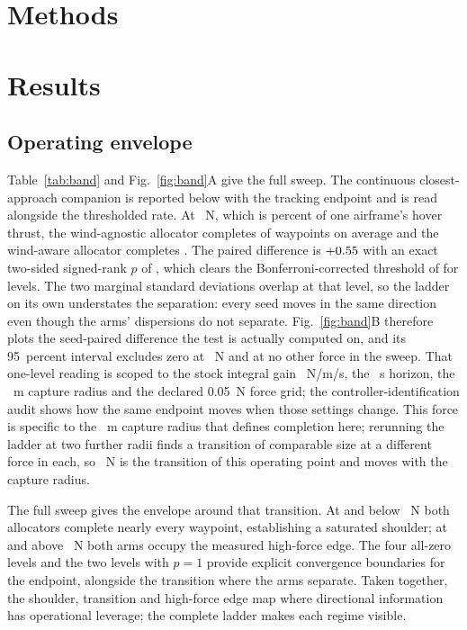 \section{Methods}



\section{Results}

\subsection{Operating envelope}

Table~\ref{tab:band} and Fig.~\ref{fig:band}A give the full sweep. The continuous
closest-approach companion is reported below with the tracking endpoint and is
read alongside the thresholded rate.
At \KneeLevel{}~N, which is \KneePctHover{} percent of one airframe's hover thrust, the
wind-agnostic allocator completes \KneeAgnostic{} of waypoints on average and the
wind-aware allocator completes \KneeAware{}. The paired difference is
$+0.55{}$ with an exact two-sided signed-rank $p$ of \KneeP{}, which clears
the Bonferroni-corrected threshold of \BonferroniAlpha{} for \NWindLevels{} levels.
The two marginal standard deviations overlap at that level, so the ladder on its
own understates the separation: every seed moves in the same direction even though
the arms' dispersions do not separate. Fig.~\ref{fig:band}B therefore plots the
seed-paired difference the test is actually computed on, and its 95~percent
interval excludes zero at \KneeLevel{}~N and at no other force in the sweep.
That one-level reading is scoped to the stock integral gain \StockKi{}~N/m/s,
the \EpisodeHorizonS{}~s horizon, the \CaptureRadius{}~m capture radius and the
declared 0.05~N force grid; the controller-identification audit shows how the
same endpoint moves when those settings change.
This force is specific to the \CaptureRadius{}~m capture radius that defines
completion here; rerunning the ladder at two further radii finds a transition
of comparable size at a different force in each, so \KneeLevel{}~N is the
transition of this operating point and moves with the capture radius.

The full sweep gives the envelope around that transition. At and below
\SaturationLevel{}~N both allocators complete nearly every waypoint, establishing a
saturated shoulder; at and above \CollapseLevel{}~N both arms occupy the measured
high-force edge. The four all-zero levels and the two levels with $p=1$ provide
explicit convergence boundaries for the endpoint, alongside the transition where
the arms separate. Taken together, the shoulder, transition and high-force edge
map where directional information has operational leverage; the complete ladder
makes each regime visible.

